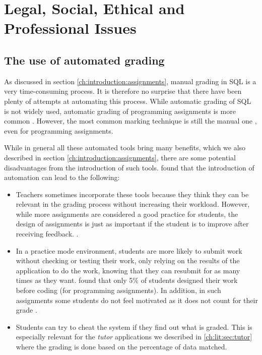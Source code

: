 \chapter{Legal, Social, Ethical and Professional Issues}

\section{The use of automated grading}

As discussed in section \ref{ch:introduction:assignments}, manual grading in SQL is a very time-consuming process. It is therefore no surprise that there have been plenty of attempts at automating this process. While automatic grading of SQL is not widely used, automatic grading of programming assignments is more common \citep{literature:assesment:automated:survey}. However, the most common marking technique is still the manual one \citep{literature:assesment:automated:survey}, even for programming assignments.

While in general all these automated tools bring many benefits, which we also described in section \ref{ch:introduction:assignments}, there are some potential disadvantages from the introduction of such tools. \cite{literature:assesment:automated:survey} found that the introduction of automation can lead to the following:
\begin{itemize}
    \item Teachers sometimes incorporate these tools because they think they can be relevant in the grading process without increasing their workload. However, while more assignments are considered a good practice for students, the design of assignments is just as important if the student is to improve after receiving feedback. \citep{literature:assesment:automated:survey, literature:assement}.
    \item In a practice mode environment, students are more likely to submit work without checking or testing their work, only relying on the results of the application to do the work, knowing that they can resubmit for as many times as they want. \cite{literature:assesment:automated:survey} found that only 5\% of students designed their work before coding (for programming assignments). In addition, in such assignments some students do not feel motivated as it does not count for their grade \citep{literature:activesql}.
    \item Students can try to cheat the system if they find out what is graded. This is especially relevant for the \textit{tutor} applications we described in \ref{ch:lit:sec:tutor} where the grading is done based on the percentage of data matched.
\end{itemize}

